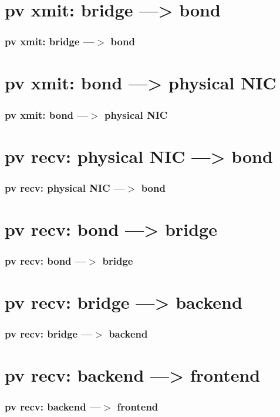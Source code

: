 \documentclass[aspectratio=169]{beamer}
\begin{document}

\section{pv xmit: bridge ---> bond}
\begin{frame}
\frametitle{pv xmit: bridge ---$>$ bond}
\end{frame}


\section{pv xmit: bond ---> physical NIC}
\begin{frame}
\frametitle{pv xmit: bond ---$>$ physical NIC}
\end{frame}


\section{pv recv: physical NIC ---> bond}
\begin{frame}
\frametitle{pv recv: physical NIC ---$>$ bond}
\end{frame}


\section{pv recv: bond ---> bridge}
\begin{frame}
\frametitle{pv recv: bond ---$>$ bridge}
\end{frame}


\section{pv recv: bridge ---> backend}
\begin{frame}
\frametitle{pv recv: bridge ---$>$ backend}
\end{frame}


\section{pv recv: backend ---> frontend}
\begin{frame}
\frametitle{pv recv: backend ---$>$ frontend}
\end{frame}
\end{document}
